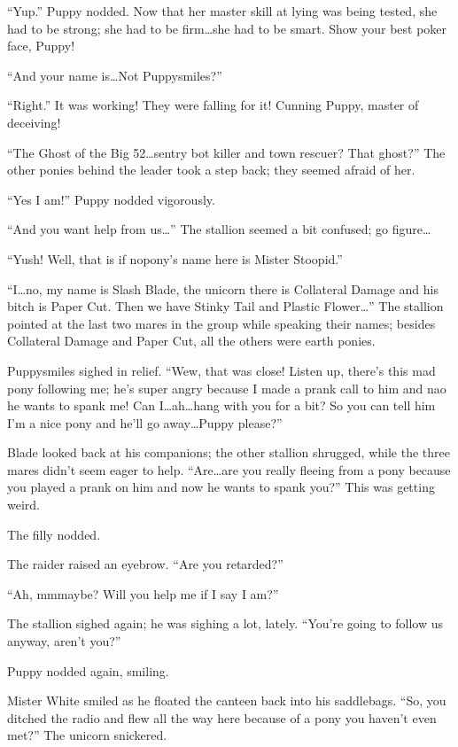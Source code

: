 ``Yup.'' Puppy nodded. Now that her master skill at lying was being tested, she had to be strong; she had to be firm\dots she had to be smart. Show your best poker face, Puppy!

``And your name is\dots Not Puppysmiles?''

``Right.'' It was working! They were falling for it! Cunning Puppy, master of deceiving!

``The Ghost of the Big 52\dots sentry bot killer and town rescuer? That ghost?'' The other ponies behind the leader took a step back; they seemed afraid of her.

``Yes I am!'' Puppy nodded vigorously.

``And you want help from us\dots'' The stallion seemed a bit confused; go figure\dots

``Yush! Well, that is if nopony's name here is Mister Stoopid.''

``I\dots no, my name is Slash Blade, the unicorn there is Collateral Damage and his bitch is Paper Cut. Then we have Stinky Tail and Plastic Flower\dots'' The stallion pointed at the last two mares in the group while speaking their names; besides Collateral Damage and Paper Cut, all the others were earth ponies.

Puppysmiles sighed in relief. ``Wew, that was close! Listen up, there's this mad pony following me; he's super angry because I made a prank call to him and nao he wants to spank me! Can I\dots ah\dots hang with you for a bit? So you can tell him I'm a nice pony and he'll go away\dots Puppy please?''

Blade looked back at his companions; the other stallion shrugged, while the three mares didn't seem eager to help. ``Are\dots are you really fleeing from a pony because you played a prank on him and now he wants to spank you?'' This was getting weird.

The filly nodded.

The raider raised an eyebrow. ``Are you retarded?''

``Ah, mmmaybe? Will you help me if I say I am?''

The stallion sighed again; he was sighing a lot, lately. ``You're going to follow us anyway, aren't you?''

Puppy nodded again, smiling.

\horizonline


Mister White smiled as he floated the canteen back into his saddlebags. ``So, you ditched the radio and flew all the way here because of a pony you haven't even met?'' The unicorn snickered.

